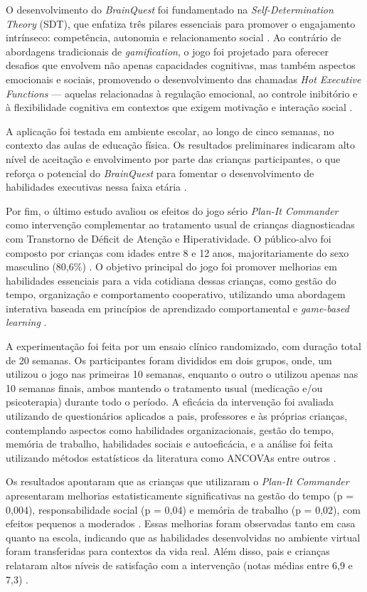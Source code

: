 O desenvolvimento do \textit{BrainQuest} foi fundamentado na \textit{Self-Determination Theory} (SDT), que enfatiza três pilares essenciais para promover o engajamento intrínseco: competência, autonomia e relacionamento social \cite{Deci2000}. Ao contrário de abordagens tradicionais de \textit{gamification}, o jogo foi projetado para oferecer desafios que envolvem não apenas capacidades cognitivas, mas também aspectos emocionais e sociais, promovendo o desenvolvimento das chamadas \textit{Hot Executive Functions} — aquelas relacionadas à regulação emocional, ao controle inibitório e à flexibilidade cognitiva em contextos que exigem motivação e interação social \cite{Zelazo2012}.

A aplicação foi testada em ambiente escolar, ao longo de cinco semanas, no contexto das aulas de educação física. Os resultados preliminares indicaram alto nível de aceitação e envolvimento por parte das crianças participantes, o que reforça o potencial do \textit{BrainQuest} para fomentar o desenvolvimento de habilidades executivas nessa faixa etária \cite{Gray2019}.

Por fim, o último estudo avaliou os efeitos do jogo sério \textit{Plan-It Commander} como intervenção complementar ao tratamento usual de crianças diagnosticadas com Transtorno de Déficit de Atenção e Hiperatividade. O público-alvo foi composto por crianças com idades entre 8 e 12 anos, majoritariamente do sexo masculino (80,6\%) \cite{Bul2016}. O objetivo principal do jogo foi promover melhorias em habilidades essenciais para a vida cotidiana dessas crianças, como gestão do tempo, organização e comportamento cooperativo, utilizando uma abordagem interativa baseada em princípios de aprendizado comportamental e \textit{game-based learning} \cite{Bul2016}.

A experimentação foi feita por um ensaio clínico randomizado, com duração total de 20 semanas. Os participantes foram divididos em dois grupos, onde, um utilizou o jogo nas primeiras 10 semanas, enquanto o outro o utilizou apenas nas 10 semanas finais, ambos mantendo o tratamento usual (medicação e/ou psicoterapia) durante todo o período.
A eficácia da intervenção foi avaliada  utilizando de questionários aplicados a pais, professores e às próprias crianças, contemplando aspectos como habilidades organizacionais, gestão do tempo, memória de trabalho, habilidades sociais e autoeficácia, e a análise foi feita utilizando métodos estatísticos da literatura como ANCOVAs entre outros \cite{Bul2016}.

Os resultados apontaram que as crianças que utilizaram o \textit{Plan-It Commander} apresentaram melhorias estatisticamente significativas na gestão do tempo (p = 0{,}004), responsabilidade social (p = 0{,}04) e memória de trabalho (p = 0{,}02), com efeitos pequenos a moderados \cite{Bul2016}. Essas melhorias foram observadas tanto em casa quanto na escola, indicando que as habilidades desenvolvidas no ambiente virtual foram transferidas para contextos da vida real. Além disso, pais e crianças relataram altos níveis de satisfação com a intervenção (notas médias entre 6,9 e 7,3) \cite{Bul2016}.


